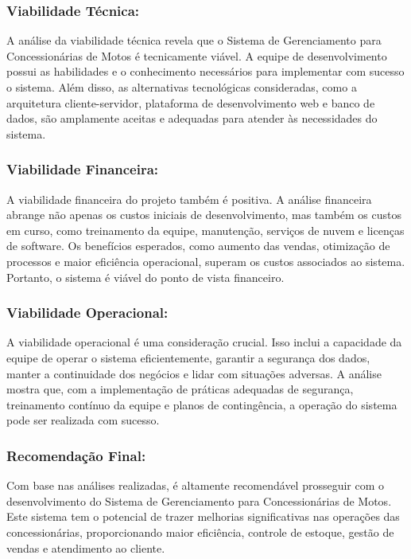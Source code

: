        \subsubsection{Viabilidade Técnica:}
       
       A análise da viabilidade técnica revela que o Sistema de Gerenciamento para Concessionárias de Motos é tecnicamente viável. A equipe de desenvolvimento possui as habilidades e o conhecimento necessários para implementar com sucesso o sistema. Além disso, as alternativas tecnológicas consideradas, como a arquitetura cliente-servidor, plataforma de desenvolvimento web e banco de dados, são amplamente aceitas e adequadas para atender às necessidades do sistema.
       
       \subsubsection{Viabilidade Financeira:}
       
       A viabilidade financeira do projeto também é positiva. A análise financeira abrange não apenas os custos iniciais de desenvolvimento, mas também os custos em curso, como treinamento da equipe, manutenção, serviços de nuvem e licenças de software. Os benefícios esperados, como aumento das vendas, otimização de processos e maior eficiência operacional, superam os custos associados ao sistema. Portanto, o sistema é viável do ponto de vista financeiro.
       
       \subsubsection{Viabilidade Operacional:}
       
       A viabilidade operacional é uma consideração crucial. Isso inclui a capacidade da equipe de operar o sistema eficientemente, garantir a segurança dos dados, manter a continuidade dos negócios e lidar com situações adversas. A análise mostra que, com a implementação de práticas adequadas de segurança, treinamento contínuo da equipe e planos de contingência, a operação do sistema pode ser realizada com sucesso.
       
       \subsubsection{Recomendação Final:}
       
       Com base nas análises realizadas, é altamente recomendável prosseguir com o desenvolvimento do Sistema de Gerenciamento para Concessionárias de Motos. Este sistema tem o potencial de trazer melhorias significativas nas operações das concessionárias, proporcionando maior eficiência, controle de estoque, gestão de vendas e atendimento ao cliente.
       
